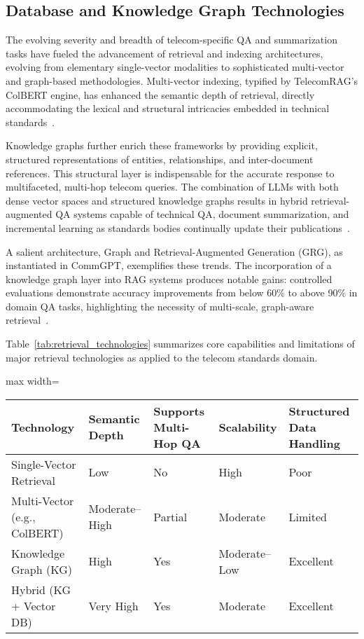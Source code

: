 \documentclass[sigconf]{acmart}
\begin{document}
\subsection{Database and Knowledge Graph Technologies}

The evolving severity and breadth of telecom-specific QA and summarization tasks have fueled the advancement of retrieval and indexing architectures, evolving from elementary single-vector modalities to sophisticated multi-vector and graph-based methodologies. Multi-vector indexing, typified by TelecomRAG's ColBERT engine, has enhanced the semantic depth of retrieval, directly accommodating the lexical and structural intricacies embedded in technical standards~\cite{ref20,ref21}.

Knowledge graphs further enrich these frameworks by providing explicit, structured representations of entities, relationships, and inter-document references. This structural layer is indispensable for the accurate response to multifaceted, multi-hop telecom queries. The combination of LLMs with both dense vector spaces and structured knowledge graphs results in hybrid retrieval-augmented QA systems capable of technical QA, document summarization, and incremental learning as standards bodies continually update their publications~\cite{ref16,ref20}.

A salient architecture, Graph and Retrieval-Augmented Generation (GRG), as instantiated in CommGPT, exemplifies these trends. The incorporation of a knowledge graph layer into RAG systems produces notable gains: controlled evaluations demonstrate accuracy improvements from below 60\% to above 90\% in domain QA tasks, highlighting the necessity of multi-scale, graph-aware retrieval~\cite{ref21}.

Table~\ref{tab:retrieval_technologies} summarizes core capabilities and limitations of major retrieval technologies as applied to the telecom standards domain.

\begin{table*}[htbp]
\centering
\caption{Characteristics of Retrieval and Indexing Technologies for Telecom Standards QA}
\label{tab:retrieval_technologies}
\begin{adjustbox}{max width=\textwidth}
\begin{tabular}{lllll}
\toprule
\textbf{Technology} & \textbf{Semantic Depth} & \textbf{Supports Multi-Hop QA} & \textbf{Scalability} & \textbf{Structured Data Handling} \\
\midrule
Single-Vector Retrieval & Low & No & High & Poor \\
Multi-Vector (e.g., ColBERT) & Moderate--High & Partial & Moderate & Limited \\
Knowledge Graph (KG) & High & Yes & Moderate--Low & Excellent \\
Hybrid (KG + Vector DB) & Very High & Yes & Moderate & Excellent \\
\bottomrule
\end{tabular}
\end{adjustbox}
\end{table*}
\end{document}
